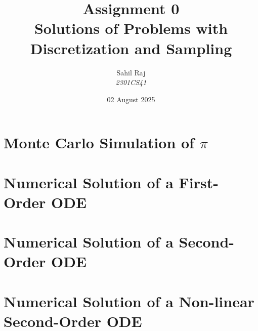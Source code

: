 \documentclass[12pt,a4paper]{report}
\title{\textbf{Assignment 0}\\Solutions of Problems with Discretization and Sampling}
\author{Sahil Raj\\\textit{2301CS41}}
\date{02 August 2025}
\begin{document}
\maketitle
\tableofcontents
\clearpage

\chapter{Monte Carlo Simulation of $\pi$}


\chapter{Numerical Solution of a First-Order ODE}


\chapter{Numerical Solution of a Second-Order ODE}


\chapter{Numerical Solution of a Non-linear Second-Order ODE}

\end{document}
